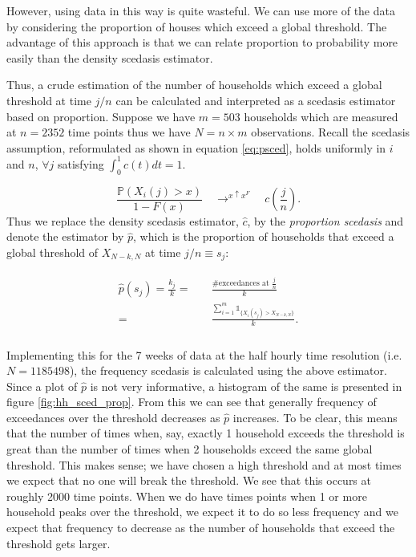 However, using data in this way is quite wasteful. We can use more of the data by considering the proportion of houses which exceed a global threshold. The advantage of this approach is that we can relate proportion to probability more easily than the density scedasis estimator. %

Thus, a crude estimation of the number of households which exceed a global threshold at time $j/n$ can be calculated and interpreted as a scedasis estimator based on proportion. Suppose we have $m = 503 $ households which are measured at $n = 2352$ time points thus we have $N= n \times m$ observations. Recall the scedasis assumption, reformulated as shown in equation \ref{eq:psced}, holds uniformly in $i$ and $n$, $\forall j$ satisfying $\int_0^1 c(t)dt = 1$.

\begin{equation} \label{eq:psced}
\frac{\mathbb{P}(X_i(j)>x)}{1-F(x)} \quad  \displaystyle{ \mathop{\rightarrow}^{x \uparrow x^F}} \quad c\left(\frac{j}{n}\right).
\end{equation}
\noindent Thus we replace the density scedasis estimator, $\hat{c}$, by the \textit{proportion scedasis} and denote the estimator by $\hat{p}$, which is the proportion of households that exceed a global threshold of $X_{N-k,N}$ at time $j/n \equiv s_j$:

\begin{align} \label{eq:sced_prop}
\begin{split}
\hat{p}(s_j) =  \frac{k_j}{k} =& \quad \frac{\# \text{exceedances at } \frac{j}{n}}{k} \\
= & \quad \frac{\displaystyle \sum_{i=1}^m \mathbb{1}_{\{X_i(s_j) > X_{N-k,N}\}}}{k}.\\
\end{split}
\end{align}

Implementing this for the 7 weeks of data at the half hourly time resolution (i.e. $N = 1185498$), the frequency scedasis is calculated using the above estimator. Since a plot of $\hat{p}$ is not very informative, a histogram of the same is presented in figure \ref{fig:hh_sced_prop}.  From this we can see that generally frequency of exceedances over the threshold decreases as $\hat{p}$ increases. To be clear, this means that the number of times when, say, exactly 1 household exceeds the threshold is great than the number of times when 2 households exceed the same global threshold. This makes sense; we have chosen a high threshold and at most times we expect that no one will break the threshold. We see that this occurs at roughly 2000 time points. When we do have times points when 1 or more household peaks over the threshold, we expect it to do so less frequency and we expect that frequency to decrease as the number of households that exceed the threshold gets larger. %

